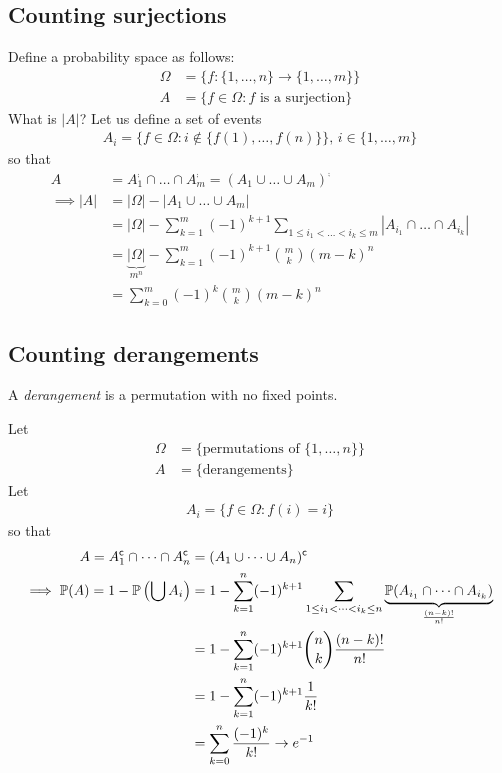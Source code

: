 \documentclass{../template/note}
\begin{document}
    \subsection{Counting surjections}

    Define a probability space as follows:
    \begin{align*}
        \Omega &= \{f: \{1, \dots, n\} \to \{1, \dots, m\}\} \\
        A &= \{f \in \Omega: f \text{ is a surjection}\}
    \end{align*}
    What is \(| A| \)? Let us define a set of events
    \begin{align*}
        A_i = \{f \in \Omega: i \notin \{f(1), \dots, f(n)\}\}, \, i \in \{1, \dots, m\}
    \end{align*}
    so that
    \begin{align*}
        A &= A_1^\comp \cap \dots \cap A_m^\comp = (A_1 \cup \dots \cup A_m)^\comp \\
        \implies | A|  &= | \Omega|  - | A_1 \cup \dots \cup A_m|  \\
        &= | \Omega|  - \sum_{k=1}^m (-1)^{k+1} \sum_{1 \leq i_1 < \dots < i_k \leq m} | A_{i_1} \cap \dots \cap A_{i_k}|  \\
        &= \underbrace{| \Omega| }_{m^n} - \sum_{k=1}^m (-1)^{k+1} \binom{m}{k} (m-k)^n \\
        &= \sum_{k=0}^m (-1)^k \binom{m}{k} (m-k)^n
    \end{align*}
    

    \subsection{Counting derangements}

    \begin{definition}
        A \emph{derangement} is a permutation with no fixed points.
    \end{definition}
    Let
    \begin{align*}
        \Omega &= \{\text{permutations of } \{1, \dots, n\}\} \\
        A &= \{\text{derangements}\}
    \end{align*}
    Let
    \begin{align*}
        A_i = \{f \in \Omega: f(i) = i\}
    \end{align*}
    so that
    \begin{align*}
        A = A_1^{\mathsf{c}} \cap \dots \cap A_n^{\mathsf{c}} &= (A_1 \cup \dots \cup A_n)^{\mathsf{c}} \\
        \implies \mathbb P(A) = 1 - \mathbb P\left(\bigcup A_i\right) &= 1 - \sum_{k=1}^n (-1)^{k+1} \sum_{1 \leq i_1 < \dots < i_k \leq n} \underbrace{\mathbb P(A_{i_1} \cap \dots \cap A_{i_k})}_{\frac{(n-k)!}{n!}} \\
        &= 1 - \sum_{k=1}^n (-1)^{k+1} \binom n k \frac{(n-k)!}{n!} \\
        &= 1 - \sum_{k=1}^n (-1)^{k+1} \frac{1}{k!} \\
        &= \sum_{k=0}^n \frac{(-1)^k}{k!} \to e^{-1}
    \end{align*}
    
\end{document}
